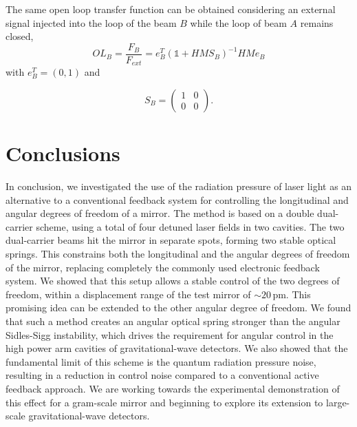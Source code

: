The same open loop transfer function can be obtained considering an external signal injected into the loop of the beam $B$ while the loop of beam $A$ remains closed,
\begin{equation}
OL_{B}=\frac{F_{B}}{F_{ext}}=e_B^{T}(\mathds{1}+HMS_B)^{-1}HMe_B
\end{equation}
with $e_B^{T}=(0,1)$ and %

\begin{equation}
S_B=
\left( \begin{array}{cc}
1 & 0\\
0 & 0
\end{array} \right).
\end{equation}


\section{Conclusions}
In conclusion, we investigated the use of the radiation pressure of laser light as an alternative to a conventional feedback system for controlling the 
longitudinal and angular degrees of freedom of a mirror.
The method is based on a double dual-carrier scheme, using a total of four detuned laser fields in two cavities. 
The two dual-carrier beams hit the mirror in separate spots, forming two stable optical springs.
This constrains both the longitudinal and the angular degrees of freedom of the mirror, replacing completely the commonly used electronic feedback system.
We showed that this setup allows a stable control of the two degrees of freedom, within a displacement range of the test mirror of $\sim 20\,$pm. This promising idea can be extended to the other angular degree of freedom.
We found that such a method creates an angular optical spring stronger than the angular Sidles-Sigg instability, which drives the requirement for angular control in the high power arm cavities of gravitational-wave detectors. We also showed that the fundamental limit of this scheme is the quantum radiation pressure noise, resulting in a reduction in control noise compared to a conventional active feedback approach. 
We are working towards the experimental demonstration of this effect for a gram-scale mirror and beginning to explore its extension
to large-scale gravitational-wave detectors.